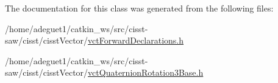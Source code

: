 The documentation for this class was generated from the following files\-:\begin{DoxyCompactItemize}
\item 
/home/adeguet1/catkin\-\_\-ws/src/cisst-\/saw/cisst/cisst\-Vector/\hyperlink{vct_forward_declarations_8h}{vct\-Forward\-Declarations.\-h}\item 
/home/adeguet1/catkin\-\_\-ws/src/cisst-\/saw/cisst/cisst\-Vector/\hyperlink{vct_quaternion_rotation3_base_8h}{vct\-Quaternion\-Rotation3\-Base.\-h}\end{DoxyCompactItemize}
